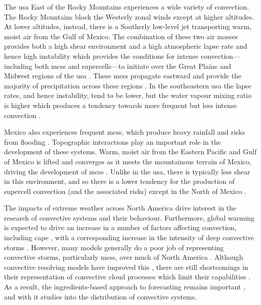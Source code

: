 The \acrfull{usa} East of the Rocky Mountains experiences a wide variety of convection.
The Rocky Mountains block the Westerly zonal winds except at higher altitudes.
At lower altitudes, instead, there is a Southerly low-level jet transporting warm, moist air from the Gulf of Mexico.
The combination of these two air masses provides both a high shear environment and a high atmospheric lapse rate and hence high instability which provides the conditions for intense convection---including both \acrshort{mcs}s and supercells---to initiate over the Great Plains and Midwest regions of the \acrshort{usa} \citep{coniglio_environmental_2010, song_contrasting_2019}.
These \acrshort{mcs}s propagate eastward and provide the majority of precipitation across these regions \citep{feng_spatiotemporal_2019}.
In the southeastern \acrshort{usa} the lapse rates, and hence instability, tend to be lower, but the water vapour mixing ratio is higher which produces a tendency towards more frequent but less intense convection \citep{brooks_climatological_2007a}.

Mexico also experiences frequent \acrshort{mcs}s, which produce heavy rainfall and risks from flooding \citep{douglas_mexican_1993}.
Topographic interactions play an important role in the development of these systems.
Warm, moist air from the Eastern Pacific and Gulf of Mexico is lifted and converges as it meets the mountainous terrain of Mexico, driving the development of \acrshort{mcs}s \citep{farfan_moving_1994}.
Unlike in the \acrshort{usa}, there is typically less shear in this environment, and so there is a lower tendency for the production of supercell convection (and the associated risks) except in the North of Mexico \citep{weiss_supercells_2008}.

The impacts of extreme weather across North America drive interest in the research of convective systems and their behaviour.
Furthermore, global warming is expected to drive an increase in a number of factors affecting convection, including \acrshort{cape} \citep{seeley_why_2015}, with a corresponding increase in the intensity of deep convective storms \citep{trapp_changes_2007, seeley_effect_2015}.
However, many models generally do a poor job of representing convective storms, particularly \acrshort{mcs}s, over much of North America \citep{pinto_assessment_2015}.
Although convective resolving models have improved this \citep{stevens_added_2020}, there are still shortcomings in their representation of convective cloud processes which limit their capabilities \citep{jeevanjee_vertical_2017}.
As a result, the ingredients-based approach to forecasting \citep{doswell_flash_1996} remains important \citep{brooks_century_2019}, and with it studies into the distribution of convective systems.

